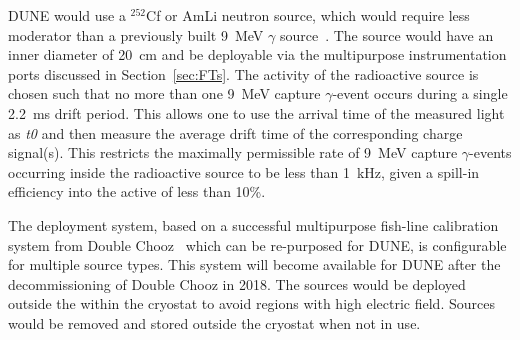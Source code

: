 DUNE would use a $^{252}$Cf or AmLi neutron source, which would require less moderator than a previously built \SI{9}{\MeV} $\gamma$ source~\cite{Rogers:1996ks}. The source would have an inner diameter of \SI{20}{\cm} and be deployable via the multipurpose instrumentation ports  discussed in Section~\ref{sec:FTs}. The activity of the radioactive source is chosen such that no more than one \SI{9}{\MeV} capture $\gamma$-event occurs during a single \SI{2.2}{\milli\s} drift period. This allows one to use the arrival time of the measured light as {\it t0} and then measure the average drift time of the corresponding charge signal(s).
This restricts the maximally permissible rate of \SI{9}{\MeV} capture $\gamma$-events occurring inside the radioactive source to be less
than \SI{1}{\kilo\hertz}, given a spill-in efficiency into the active  of
less than \num{10}\%.

The deployment system, based on a successful multipurpose fish-line calibration system from Double Chooz~\cite{} 
which can be re-purposed for DUNE, is configurable for multiple source types. This system will become available for DUNE after the decommissioning of Double Chooz in 2018. The sources would be deployed outside the  within the cryostat to avoid regions with high electric field. Sources would be removed and stored outside the cryostat when not in use.


